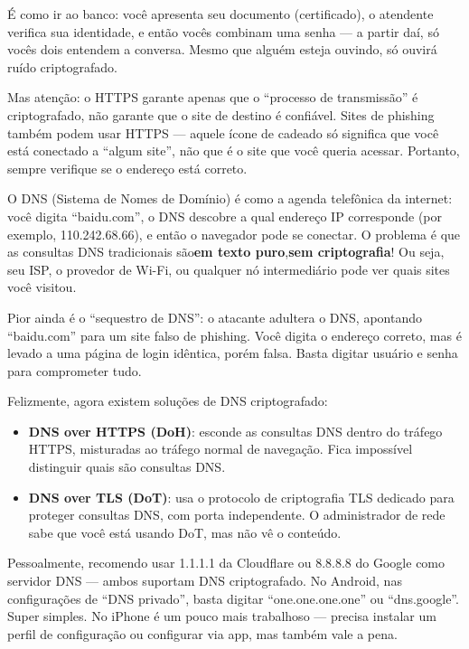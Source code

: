 É como ir ao banco: você apresenta seu documento (certificado), o atendente verifica sua identidade, e então vocês combinam uma senha — a partir daí, só vocês dois entendem a conversa. Mesmo que alguém esteja ouvindo, só ouvirá ruído criptografado.

Mas atenção: o HTTPS garante apenas que o “processo de transmissão” é criptografado, não garante que o site de destino é confiável. Sites de phishing também podem usar HTTPS — aquele ícone de cadeado só significa que você está conectado a “algum site”, não que é o site que você queria acessar. Portanto, sempre verifique se o endereço está correto.


O DNS (Sistema de Nomes de Domínio) é como a agenda telefônica da internet: você digita “baidu.com”, o DNS descobre a qual endereço IP corresponde (por exemplo, 110.242.68.66), e então o navegador pode se conectar. O problema é que as consultas DNS tradicionais são\textbf{em texto puro},\textbf{sem criptografia}! Ou seja, seu ISP, o provedor de Wi-Fi, ou qualquer nó intermediário pode ver quais sites você visitou.

Pior ainda é o “sequestro de DNS”: o atacante adultera o DNS, apontando “baidu.com” para um site falso de phishing. Você digita o endereço correto, mas é levado a uma página de login idêntica, porém falsa. Basta digitar usuário e senha para comprometer tudo.

Felizmente, agora existem soluções de DNS criptografado:

\begin{itemize}
  \item \textbf{DNS over HTTPS (DoH)}: esconde as consultas DNS dentro do tráfego HTTPS, misturadas ao tráfego normal de navegação. Fica impossível distinguir quais são consultas DNS.
  \item \textbf{DNS over TLS (DoT)}: usa o protocolo de criptografia TLS dedicado para proteger consultas DNS, com porta independente. O administrador de rede sabe que você está usando DoT, mas não vê o conteúdo.
\end{itemize}

Pessoalmente, recomendo usar 1.1.1.1 da Cloudflare ou 8.8.8.8 do Google como servidor DNS — ambos suportam DNS criptografado. No Android, nas configurações de “DNS privado”, basta digitar “one.one.one.one” ou “dns.google”. Super simples. No iPhone é um pouco mais trabalhoso — precisa instalar um perfil de configuração ou configurar via app, mas também vale a pena.

